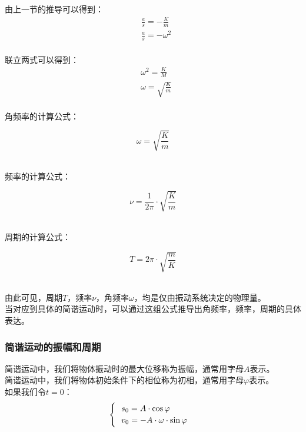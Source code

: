 \documentclass[UTF8]{ctexart}
\begin{document}
\newpage

    由上一节的推导可以得到：
    \begin{align}
        &\frac{a}{s}=-\frac{K}{m}\\[4mm]
        &\frac{a}{s}=-\omega^2
    \end{align}\\
    联立两式可以得到：
    \begin{align}
        &\omega^2=\frac{K}{M}\\[4mm]
        &\omega=\sqrt{\frac{K}{m}}
    \end{align}\\
    角频率的计算公式：
    \begin{large}
        \begin{equation*}
            \omega=\sqrt{\frac{K}{m}}
        \end{equation*}
    \end{large}\\
    频率的计算公式：
    \begin{large}
        \begin{equation*}
            \nu=\frac{1}{2\pi}\cdot\sqrt{\frac{K}{m}}
        \end{equation*}
    \end{large}\\
    周期的计算公式：
    \begin{large}
        \begin{equation*}
            T=2\pi\cdot\sqrt{\frac{m}{K}}
        \end{equation*}
    \end{large}\\
    由此可见，周期$T$，频率$\nu$，角频率$\omega$，均是仅由振动系统决定的物理量。\\[3mm]
    当对应到具体的简谐运动时，可以通过这组公式推导出角频率，频率，周期的具体表达。\\

\subsubsection{简谐运动的振幅和周期}
    简谐运动中，我们将物体振动时的最大位移称为振幅，通常用字母$A$表示。\\[3mm]
    简谐运动中，我们将物体初始条件下的相位称为初相，通常用字母$\varphi$表示。\\[5mm]
    如果我们令$t=0$：
    \setcounter{equation}{0}
    \begin{align}
        \begin{cases}
            ~~s_0=A\cdot\cos{\varphi}\\
            ~~v_0=-A\cdot\omega\cdot\sin{\varphi}\vspace{1pt}
        \end{cases}
    \end{align}
\end{document}
